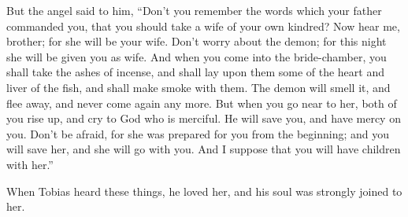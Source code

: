 {\par }{\PP {}But the angel said to him, “Don’t you remember the words which your father commanded you, that you should take a wife of your own kindred? Now hear me, brother; for she will be your wife. Don’t worry about the demon; for this night she will be given you as wife.
And when you come into the bride-chamber, you shall take the ashes of incense, and shall lay upon them some of the heart and liver of the fish, and shall make smoke with them.
The demon will smell it, and flee away, and never come again any more. But when you go near to her, both of you rise up, and cry to God who is merciful. He will save you, and have mercy on you. Don’t be afraid, for she was prepared for you from the beginning; and you will save her, and she will go with you. And I suppose that you will have children with her.”
\par }{\PP When Tobias heard these things, he loved her, and his soul was strongly joined to her.

}
